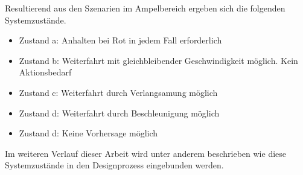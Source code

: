 Resultierend aus den Szenarien im Ampelbereich ergeben sich die folgenden Systemzustände.
\begin{itemize}
	\item Zustand a: Anhalten bei Rot in jedem Fall erforderlich
	\item Zustand b: Weiterfahrt mit gleichbleibender Geschwindigkeit möglich. Kein Aktionsbedarf
	\item Zustand c: Weiterfahrt durch Verlangsamung möglich
	\item Zustand d: Weiterfahrt durch Beschleunigung möglich
	\item Zustand d: Keine Vorhersage möglich
\end{itemize}
Im weiteren Verlauf dieser Arbeit wird unter anderem beschrieben wie diese Systemzustände in den Designprozess eingebunden werden.
